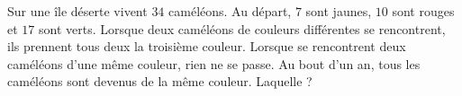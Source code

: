 Sur une île déserte vivent $34$ caméléons. Au départ, $7$ sont jaunes, $10$ sont rouges et $17$ sont verts. Lorsque deux caméléons de couleurs différentes se rencontrent, ils prennent tous deux la troisième couleur. Lorsque se rencontrent deux caméléons d'une même couleur, rien ne se passe. Au bout d'un an, tous les caméléons sont devenus de la même couleur. Laquelle ?
